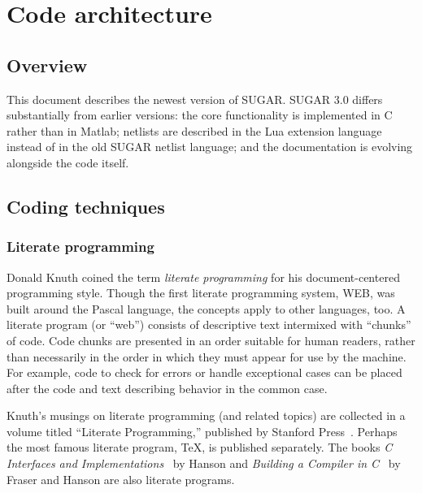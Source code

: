 
\chapter{Code architecture}

\section{Overview}


This document describes the newest version of SUGAR.  SUGAR 3.0
differs substantially from earlier versions: the core functionality
is implemented in C rather than in Matlab; netlists are described
in the Lua extension language instead of in the old SUGAR netlist
language; and the documentation is evolving alongside the
code itself.


\section{Coding techniques}

\subsection{Literate programming}


Donald Knuth coined the term \emph{literate programming} for his
document-centered programming style.  Though the first literate
programming system, WEB, was built around the Pascal language,
the concepts apply to other languages, too.
A literate program (or ``web'')
consists of descriptive text intermixed with ``chunks'' of code.
Code chunks are presented in an order suitable for human readers,
rather than necessarily in the order in which they must appear for
use by the machine.  For example, code to check for errors or handle
exceptional cases can be placed after the code and text describing
behavior in the common case.

Knuth's musings on literate programming (and related topics) are
collected in a volume titled ``Literate Programming,'' published by
Stanford Press~\cite{Knut92}.  Perhaps the most famous literate program, TeX,
is published separately.  The books 
\emph{C Interfaces and Implementations}~\cite{Hans96} by Hanson and
\emph{Building a Compiler in C}~\cite{FrasHans95} by Fraser and Hanson 
are also literate programs.

